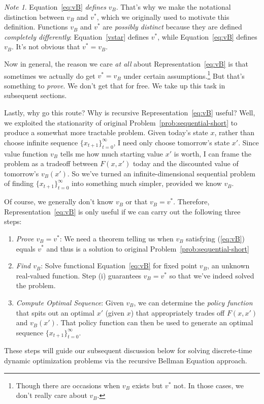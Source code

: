 \documentclass[12pt]{article}
\numberwithin{equation}{section} %
\theoremstyle{plain}
\theoremstyle{definition}
\theoremstyle{remark}
\newtheorem*{note}{Note}
\newcommand{\tinfz}{_{t=0}^\infty}
\begin{document}
\begin{note}
Equation~\ref{eq:vB} \emph{defines} $v_B$.
That's why we make the notational distinction between $v_B$ and $v^*$,
which we originally used to motivate this definition.
Functions $v_B$ and $v^*$ are \emph{possibly distinct} because
they are defined \emph{completely differently}:
Equation~\ref{vstar} defines $v^*$, while
Equation~\ref{eq:vB} defines $v_B$.
It's not obvious that $v^*=v_B$.

Now in general, the reason we care \emph{at all} about
Representation~\ref{eq:vB} is that sometimes we actually do get
$v^*=v_B$ under certain assumptions.\footnote{%
  Though there are occasions when $v_B$ exists but $v^*$ not.
  In those cases, we don't really care about $v_B$.
}
But that's something to \emph{prove}.  We don't get that for free.
We take up this task in subsequent sections.
\end{note}

Lastly, why go this route? Why is recursive
Representation~\ref{eq:vB} useful? Well, we exploited the stationarity
of original Problem~\ref{prob:sequential-short} to produce a
somewhat more tractable problem.  Given today's state $x$, rather than
choose infinite sequence $\{x_{t+1}\}_{t=0}^\infty$,
I need only choose tomorrow's state $x'$. Since value function $v_B$
tells me how much starting value $x'$ is worth, I can frame the
problem as a tradeoff between $F(x,x')$ today and the discounted value
of tomorrow's $v_B(x')$.  So we've turned an infinite-dimensional
sequential problem of finding $\{x_{t+1}\}^\infty_{t=0}$ into something
much simpler, provided we know $v_B$.

Of course, we generally don't know $v_B$ or that $v_B=v^*$.
Therefore, Representation~\ref{eq:vB} is only useful if we can carry
out the following three steps:
\begin{enumerate}[label=(\roman*)]
  \item
    \emph{Prove $v_B=v^*$}:
    We need a theorem telling us when $v_B$ satisfying (\ref{eq:vB})
    equals $v^*$ and thus is a solution to original
    Problem~\ref{prob:sequential-short}

  \item \emph{Find $v_B$}:
    Solve functional Equation~\ref{eq:vB} for fixed point $v_B$, an
    unknown real-valued function. Step (i) guarantees $v_B=v^*$ so that
    we've indeed solved the problem.

  \item \emph{Compute Optimal Sequence}:
    Given $v_B$, we can determine the \emph{policy function} that
    spits out an optimal $x'$ (given $x$) that appropriately trades off
    $F(x,x')$ and $v_B(x')$. That policy function can then be used to
    generate an optimal sequence $\{x_{t+1}\}\tinfz$.
\end{enumerate}
These steps will guide our subsequent discussion below for solving
discrete-time dynamic optimization problems via the recursive Bellman
Equation approach.
\end{document}
